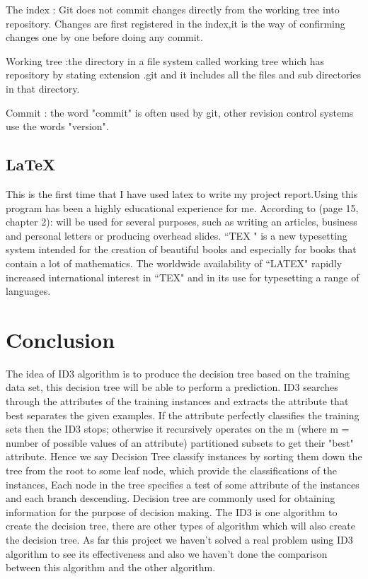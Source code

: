 \documentclass{report}
\begin{document}
The index : Git does not commit changes directly from the working tree into repository. Changes are first registered in the index,it is the way of confirming changes one by one before doing any commit.																										

Working tree :the directory in a file system called working tree which has repository by stating extension .git and it includes all the files and sub directories in that  directory.

Commit : the word "commit" is often used by git, other revision control systems use the words "version".

\subsection{\LaTeX{}}
\label{sec:lat}

This is the first time that I have used latex to write my project report.Using this program has been a highly educational experience for me. 
According to \cite{Mittelbach2004TheLatexCompanion} (page 15, chapter 2): 
 will be used for several purposes, such as writing an articles, business and personal letters or producing overhead slides.
``TEX " is a new typesetting system intended for the creation of beautiful books and especially for books that contain a lot of mathematics. The worldwide availability of ``LATEX" rapidly increased international interest in ``TEX" and in its use for typesetting a range of languages.

\section{Conclusion}
\label{sec:con}

The idea of ID3 algorithm is to produce the decision tree based on the training data set, this decision tree will be able to perform a  prediction.
ID3 searches through the attributes of the training instances and extracts the attribute that best separates the given examples. If the attribute perfectly classifies the training sets then the ID3 stops; otherwise it recursively operates on the m (where m = number of possible values of an attribute) partitioned subsets to get their "best" attribute.
Hence we say Decision Tree classify instances by sorting them down the tree from the root to some leaf node, which provide the classifications of the instances, Each node in the tree specifies a test of some attribute of the instances and each branch descending.
Decision tree are commonly used for obtaining information for the purpose of decision making. 
The ID3 is one algorithm to create the decision tree, there are other types of algorithm which will also create the decision tree. As far this project we haven't solved a real problem using ID3 algorithm to see its effectiveness and also we haven't done the comparison between this algorithm and the other algorithm.






\end{document}
